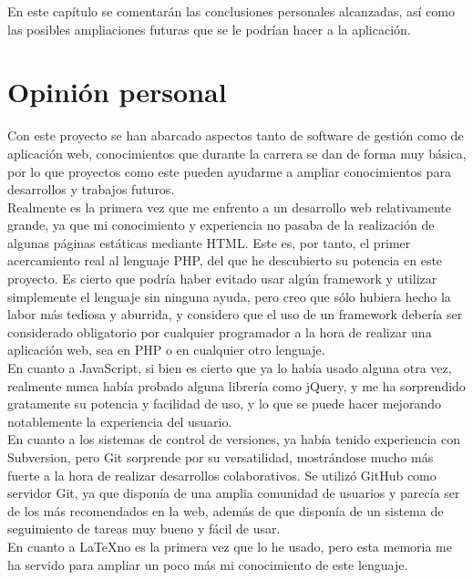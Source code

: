 En este capítulo se comentarán las conclusiones personales alcanzadas, así como las posibles ampliaciones futuras que se le podrían hacer a la aplicación.

\section{Opinión personal}

Con este proyecto se han abarcado aspectos tanto de software de gestión como de aplicación web, conocimientos que durante la carrera se dan de forma muy básica, por lo que proyectos como este pueden ayudarme a ampliar conocimientos para desarrollos y trabajos futuros.\\

Realmente es la primera vez que me enfrento a un desarrollo web relativamente grande, ya que mi conocimiento y experiencia no pasaba de la realización de algunas páginas estáticas mediante HTML. Este es, por tanto, el primer acercamiento real al lenguaje PHP, del que he descubierto su potencia en este proyecto. Es cierto que podría haber evitado usar algún framework y utilizar simplemente el lenguaje sin ninguna ayuda, pero creo que sólo hubiera hecho la labor más tediosa y aburrida, y considero que el uso de un framework debería ser considerado obligatorio por cualquier programador a la hora de realizar una aplicación web, sea en PHP o en cualquier otro lenguaje.\\

En cuanto a JavaScript, si bien es cierto que ya lo había usado alguna otra vez, realmente nunca había probado alguna librería como jQuery, y me ha sorprendido gratamente su potencia y facilidad de uso, y lo que se puede hacer mejorando notablemente la experiencia del usuario.\\

En cuanto a los sistemas de control de versiones, ya había tenido experiencia con Subversion, pero Git sorprende por su versatilidad, mostrándose mucho más fuerte a la hora de realizar desarrollos colaborativos. Se utilizó GitHub como servidor Git, ya que disponía de una amplia comunidad de usuarios y parecía ser de los más recomendados en la web, además de que disponía de un sistema de seguimiento de tareas muy bueno y fácil de usar.\\

En cuanto a \LaTeX no es la primera vez que lo he usado, pero esta memoria me ha servido para ampliar un poco más mi conocimiento de este lenguaje.

